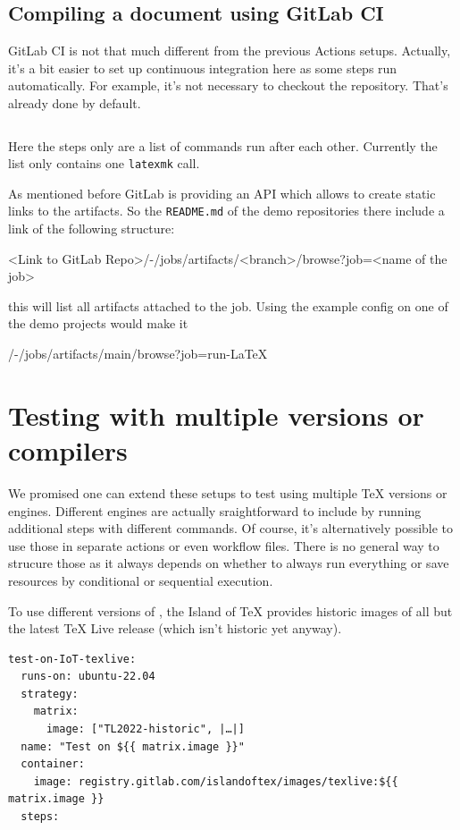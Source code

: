 \documentclass[final]{ltugboat}
\newcommand*{\TeXLive}{\acro{\TeX\,Live}}
\newcommand*{\command}[1]{\texttt{#1}}
\newcommand*{\file}[1]{\texttt{#1}}
\begin{document}
\subsection{Compiling a document using GitLab CI}

GitLab CI is not that much different from the previous Actions setups.
Actually, it's a bit easier to set up continuous integration here as some steps run automatically.
For example, it's not necessary to checkout the repository.
That's already done by default.

\inputminted[breaklines,breakafter=/]{yaml}{examples/latex-basic-gitlab.yml}

Here the steps only are a list of commands run after each other. Currently the list only contains one \command{latexmk} call.

As mentioned before GitLab is providing an API which allows to create static links to the artifacts.
So the \file{README.md} of the demo repositories there include a link of the following structure:

<Link to GitLab Repo>/-/jobs/artifacts/<branch>/browse?job=<name of the job>

this will list all artifacts attached to the job.
Using the example config on one of the demo projects would make it

/-/jobs/artifacts/main/browse?job=run-LaTeX

\section{Testing with multiple versions or compilers}

We promised one can extend these setups to test using multiple TeX versions or engines.
Different engines are actually sraightforward to include by running additional steps with different commands.
Of course, it's alternatively possible to use those in separate actions or even workflow files.
There is no general way to strucure those as it always depends on whether to always run everything or save resources by conditional or sequential execution.

To use different versions of \TeXLive{}, the Island of TeX provides historic images of all but the latest TeX Live release (which isn't historic yet anyway).

\begin{verbatim}
test-on-IoT-texlive:
  runs-on: ubuntu-22.04
  strategy:
    matrix:
      image: ["TL2022-historic", |…|]
  name: "Test on ${{ matrix.image }}"
  container:
    image: registry.gitlab.com/islandoftex/images/texlive:${{ matrix.image }}
  steps:
\end{verbatim}
\end{document}
